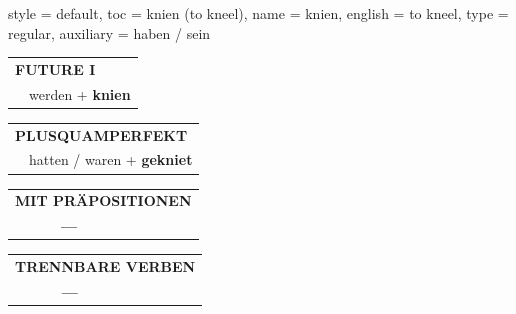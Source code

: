 \begin{verbentry}{
  style = {default},
  toc = {knien (to kneel)},
  name = {knien},
  english = {to kneel},
  type = {regular},
  auxiliary = {haben / sein}
}
\begin{tabular}{rl}
    \multicolumn{2}{l}{\textbf{FUTURE I} }\\
   & werden + \textbf{knien}\\
 
  \end{tabular}
\hfill
   \begin{tabular}{rl}
      \multicolumn{2}{l}{\textbf{PLUSQUAMPERFEKT}}\\
   & hatten / waren + \textbf{gekniet}\\
  \end{tabular}
  
  \vspace{10pt}



\begin{tabular}{lll}
\multicolumn{3}{l}{\textbf{MIT PRÄPOSITIONEN}}\\
& \textbf{---} & \\
\end{tabular}
\hfill
\begin{tabular}{lll}
\multicolumn{3}{l}{\textbf{TRENNBARE VERBEN}}\\
& \textbf{---} & \\
\end{tabular}

  \vspace{-5pt}
\end{verbentry}

